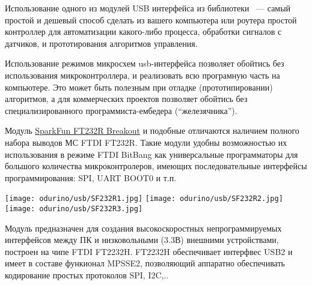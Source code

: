 \secdown

Использование одного из модулей USB интерфейса из библиотеки \odurino\ --- самый
простой и дешевый способ сделать из вашего компьютера или роутера простой 
контроллер для автоматизации какого-либо процесса, обработки сигналов с
датчиков, и прототирования алгоритмов управления.

Использование  режимов микросхем usb-интерфейса
позволяет обойтись без использования микроконтроллера, и реализовать всю
програмную часть на компьютере. Это может быть полезным при отладке
(прототипировании) алгоритмов, а для коммерческих проектов позволяет обойтись
без специализированного программиста-ембедера (``железячника'').

\label{HEXFT232RL}

Модуль \href{https://www.sparkfun.com/products/retired/718}{SparkFun FT232R
Breakout} и подобные отличаются наличием полного набора выводов МС FTDI FT232R.
Такие модули удобны возможностью их использования в режиме FTDI BitBang как
универсальные программаторы для большого количества микроконтролеров, имеющих
последовательные интерфейсы программирования: SPI, UART BOOT0 и т.п.

\texttt{[image: odurino/usb/SF232R1.jpg]}
\texttt{[image: odurino/usb/SF232R2.jpg]}
\texttt{[image: odurino/usb/SF232R3.jpg]}

\label{FT2232H}

Модуль предназначен для создания высокоскоростных непрограммируемых интерфейсов
между ПК и низковольными (3.3В) внешними устройствами, построен на чипе FTDI
FT2232H. FT2232H обеспечивает интерфвес USB2 и имеет в составе функионал
MPSSE2, позволяющий аппаратно обеспечивать кодирование простых протоколов SPI,
I2C,..

\secup
